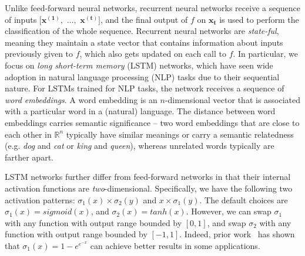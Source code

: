 Unlike feed-forward neural networks, recurrent neural networks receive a
sequence of inputs $ [\mathbf{x^{(1)}}, $  $ \dots, $  $ \mathbf{x^{(t)}} ] $, and
the
final
output of $ f $ on $ \mathbf{x_t} $ is used to perform the classification of
the whole sequence. Recurrent neural networks are
\textit{state-ful}, meaning they maintain a state vector
that contains information about inputs previously given to
$ f $, which also gets updated on each call to $ f $.
%
In particular, we focus on \textit{long short-term memory} (LSTM) networks, which
have seen wide adoption in natural language processing (NLP) tasks due to their
sequential nature. For LSTMs trained for NLP tasks, the network receives a
sequence of \textit{word embeddings}. A word embedding is an $ n $-dimensional
vector that is associated with a particular word in a (natural) language. The
distance between word embeddings carries semantic significance -- two word
embeddings that are close to each other in $ \mathbb{R}^n $ typically have
similar meanings or carry a semantic relatedness (e.g. \textit{dog} and
\textit{cat} or \textit{king} and \textit{queen}), whereas unrelated words
typically are farther apart.

LSTM networks further differ from feed-forward networks in
that their internal activation functions are \textit{two}-dimensional.
Specifically, we have the following two activation patterns: $ \sigma_1(x)
\times \sigma_2(y) $ and $ x \times \sigma_1(y) $. The default choices are $
\sigma_1(x) = sigmoid(x) $, and $ \sigma_2(x) = tanh(x) $. However, we can swap
$ \sigma_1 $ with any function with output range bounded by $ [0, 1] $, and
swap $ \sigma_2 $ with any function with output range bounded by $ [-1, 1] $.
Indeed, prior work~\cite{gomes2008complementary} has shown that $ \sigma_1(x) =
1 - e^{e^{-x}} $ can achieve better results in some applications.



%

